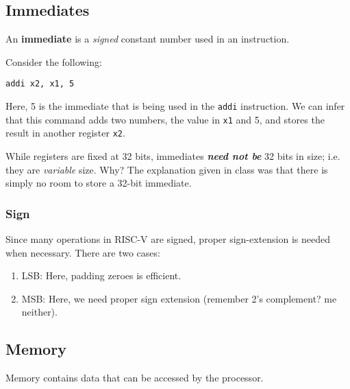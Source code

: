 \documentclass{report}
\newcommand{\definition}[2]{\begin{tcolorbox}[title={Definition: #1}]{#2}\end{tcolorbox}}
\newcommand{\example}[2]{\begin{tcolorbox}[colback=blue!5!white,colframe=black!75!blue,title={Example:
      #1}]{#2}\end{tcolorbox}}
\newcommand{\corollary}[2]{\begin{tcolorbox}[colback=teal!5!white,colframe=black!75!teal,title={Corollary:
      #1}]{#2}\end{tcolorbox}}
\begin{document}
\subsection{Immediates}
\definition{Immediate}{
  An \textbf{immediate} is a \textit{signed} constant number used in an instruction.
}

\example{\texttt{addi}}{
  Consider the following:
  \begin{center}
    \texttt{addi x2, x1, 5}
  \end{center}
  Here, 5 is the immediate that is being used in the \texttt{addi} instruction. We can infer that
  this command adds two numbers, the value in \texttt{x1} and 5, and stores the result in another
  register \texttt{x2}.
}

\corollary{IMPORTANT: Immediate Sizes}{
  While registers are fixed at 32 bits, immediates \textbf{\textit{need not be}} 32 bits in
  size; i.e. they are \textit{variable} size. Why? The explanation given in class was that there is
  simply no room to store a 32-bit immediate.
}

\subsubsection{Sign}
Since many operations in RISC-V are signed, proper sign-extension is needed when necessary. There
are two cases:
\begin{enumerate}[label=\textit{Case (\roman*)}]
\item LSB: Here, padding zeroes is efficient.
\item MSB: Here, we need proper sign extension (remember 2's complement? me neither).
\end{enumerate}


\subsection{Memory}
Memory contains data that can be accessed by the processor. 
\end{document}
